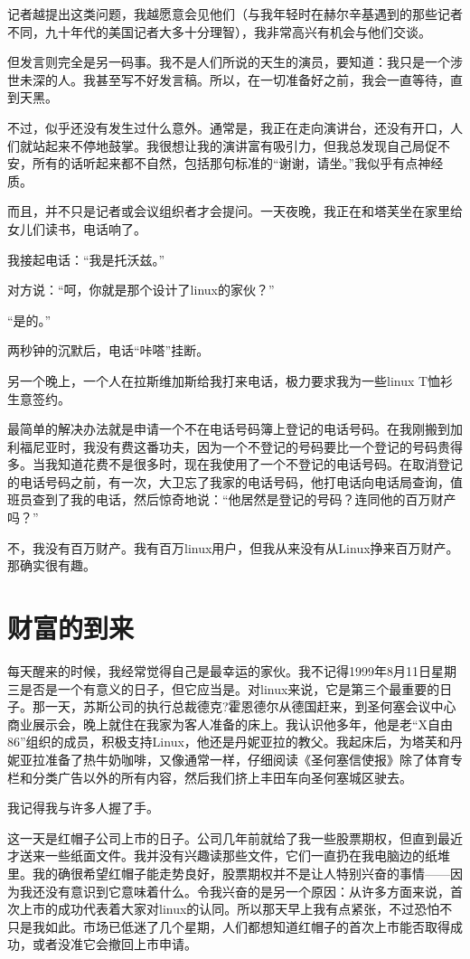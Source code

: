 记者越提出这类问题，我越愿意会见他们（与我年轻时在赫尔辛基遇到的那些记者不同，九十年代的美国记者大多十分理智），我非常高兴有机会与他们交谈。

但发言则完全是另一码事。我不是人们所说的天生的演员，要知道：我只是一个涉世未深的人。我甚至写不好发言稿。所以，在一切准备好之前，我会一直等待，直到天黑。

不过，似乎还没有发生过什么意外。通常是，我正在走向演讲台，还没有开口，人们就站起来不停地鼓掌。我很想让我的演讲富有吸引力，但我总发现自己局促不安，所有的话听起来都不自然，包括那句标准的“谢谢，请坐。”我似乎有点神经质。

而且，并不只是记者或会议组织者才会提问。一天夜晚，我正在和塔芙坐在家里给女儿们读书，电话响了。

我接起电话：“我是托沃兹。”

对方说：“呵，你就是那个设计了linux的家伙？”

“是的。”

两秒钟的沉默后，电话“咔嗒”挂断。

另一个晚上，一个人在拉斯维加斯给我打来电话，极力要求我为一些linux T恤衫生意签约。

最简单的解决办法就是申请一个不在电话号码簿上登记的电话号码。在我刚搬到加利福尼亚时，我没有费这番功夫，因为一个不登记的号码要比一个登记的号码贵得多。当我知道花费不是很多时，现在我使用了一个不登记的电话号码。在取消登记的电话号码之前，有一次，大卫忘了我家的电话号码，他打电话向电话局查询，值班员查到了我的电话，然后惊奇地说：“他居然是登记的号码？连同他的百万财产吗？”

不，我没有百万财产。我有百万linux用户，但我从来没有从Linux挣来百万财产。那确实很有趣。

 
\section{财富的到来}

每天醒来的时候，我经常觉得自己是最幸运的家伙。我不记得1999年8月11日星期三是否是一个有意义的日子，但它应当是。对linux来说，它是第三个最重要的日子。那一天，苏斯公司的执行总裁德克?霍恩德尔从德国赶来，到圣何塞会议中心商业展示会，晚上就住在我家为客人准备的床上。我认识他多年，他是老“X自由86”组织的成员，积极支持Linux，他还是丹妮亚拉的教父。我起床后，为塔芙和丹妮亚拉准备了热牛奶咖啡，又像通常一样，仔细阅读《圣何塞信使报》除了体育专栏和分类广告以外的所有内容，然后我们挤上丰田车向圣何塞城区驶去。

我记得我与许多人握了手。

这一天是红帽子公司上市的日子。公司几年前就给了我一些股票期权，但直到最近才送来一些纸面文件。我并没有兴趣读那些文件，它们一直扔在我电脑边的纸堆里。我的确很希望红帽子能走势良好，股票期权并不是让人特别兴奋的事情——因为我还没有意识到它意味着什么。令我兴奋的是另一个原因：从许多方面来说，首次上市的成功代表着大家对linux的认同。所以那天早上我有点紧张，不过恐怕不只是我如此。市场已低迷了几个星期，人们都想知道红帽子的首次上市能否取得成功，或者没准它会撤回上市申请。

